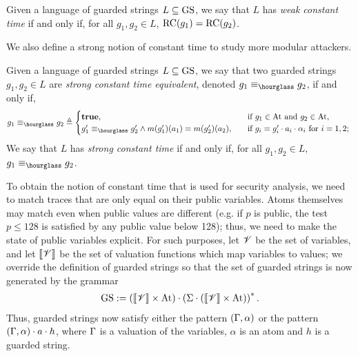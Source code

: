 \begin{definition}
Given a language of guarded strings $L\subseteq \text{GS}$, we say that $L$ has \emph{weak constant time} if and only if, for all $g_1, g_2 \in L$, $\text{RC}(g_1)=\text{RC}(g_2)$. 
\end{definition}

We also define a strong notion of constant time to study more modular attackers.
\begin{definition}
Given a language of guarded strings $L\subseteq \text{GS}$, we say that two guarded strings $g_1, g_2 \in L$ are \emph{strong constant time equivalent}, denoted $g_1 \timeequiv g_2$, if and only if,
\begin{align}
g_1 \timeequiv g_2 \triangleq \begin{cases}
\textbf{true}, &\quad \text{if $g_1\in \Atom$ and $g_2\in \Atom$,}\\
g_1' \timeequiv g_2' \land m(g'_1)(a_1)=m(g'_2)(a_2),&\quad \text{if $g_i=g_i' \cdot a_i\cdot \alpha_i $ for $i=1,2$; }
\end{cases}
\end{align}
We say that  $L$ has \emph{strong constant time} if and only if, for all $g_1, g_2 \in L$, $g_1\timeequiv g_2$.
\end{definition}

To obtain the notion of constant time that is used for security analysis, we need to match traces that are only equal on their public variables. Atoms themselves may match even when public values are different (e.g. if $p$ is public, the test $p\leq 128$ is satisfied by any public value below 128); thus, we need to make the state of public variables explicit. For such purposes, let $\mathscr{V}$ be the set of variables, and let $\llbracket \mathscr{V}\rrbracket$ be the set of valuation functions which map variables to values; we override the definition of guarded strings so that the set of guarded strings is now generated by the grammar
\begin{align}
\text{GS} := \left(\llbracket \mathscr{V}\rrbracket\times\text{At}\right) \cdot \left(\Sigma\cdot \left(\llbracket \mathscr{V}\rrbracket\times\text{At}\right)\right)^{*}.
\end{align}
Thus, guarded strings now satisfy either the pattern $(\Gamma,\alpha)$ or the pattern $(\Gamma,\alpha)\cdot a\cdot h$, where $\Gamma$ is a valuation of the variables, $\alpha$ is an atom and $h$ is a guarded string.

